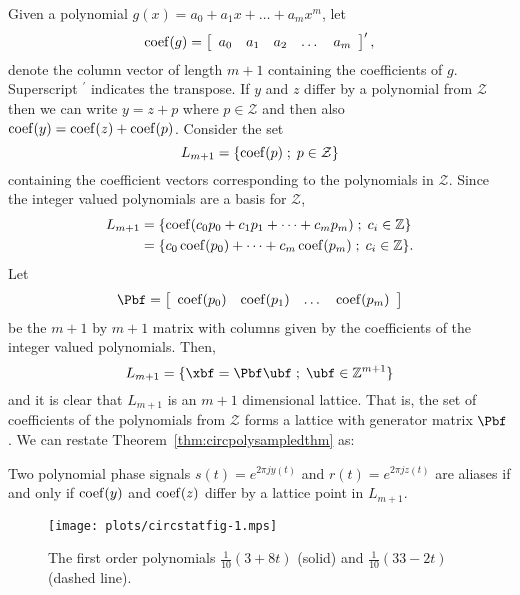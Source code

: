 \documentclass[journal]{IEEEtran}
\begin{document}
Given a polynomial $g(x) = a_0 + a_1x + \dots + a_m x^m$, let
\[
\operatorname{coef}(g) = \left[ \begin{array}{ccccc} a_0 & a_1 & a_2 & \dots & a_m \end{array} \right]^\prime,
\]
denote the column vector of length $m+1$ containing the coefficients of $g$.  Superscript $^\prime$ indicates the transpose.  If $y$ and $z$ differ by a polynomial from $\mathcal{Z}$ then we can write $y = z + p$ where $p \in \mathcal{Z}$ and then also $\operatorname{coef}(y) = \operatorname{coef}(z) + \operatorname{coef}(p)$.
  Consider the set
\[
L_{m+1} = \{ \operatorname{coef}(p) \; ; \; p \in \mathcal{Z} \}
\]
containing the coefficient vectors corresponding to the polynomials in $\mathcal{Z}$.  Since the integer valued polynomials are a basis for $\mathcal{Z}$,
\begin{align*}
L_{m+1} &= \{ \operatorname{coef}(c_0 p_0 + c_1p_1 + \dots + c_mp_m) \; ; \; c_i \in {\mathbb Z} \} \\
&= \{ c_0 \operatorname{coef}(p_0) + \dots + c_m\operatorname{coef}(p_m) \; ; \; c_i \in {\mathbb Z} \}.
\end{align*}
Let
\[
\Pbf = \left[ \begin{array}{cccc} \coef(p_0)& \coef(p_1)& \dots& \coef(p_m)  \end{array} \right]
\]
be the $m+1$ by $m+1$ matrix with columns given by the coefficients of the integer valued polynomials.  Then,
\[
L_{m+1} = \{ \xbf = \Pbf\ubf \mid \ubf \in \ints^{m+1} \}
\]
and it is clear that $L_{m+1}$ is an $m+1$ dimensional lattice.  That is, the set of coefficients of the polynomials from $\mathcal{Z}$ forms a lattice with generator matrix $\Pbf$. We can restate Theorem~\ref{thm:circpolysampledthm} as:
\begin{corollary}\label{cor:circpolysampledcoef}
Two polynomial phase signals $s(t) = e^{2\pi j y(t)}$  and $r(t) = e^{2\pi j z(t)}$ are aliases if and only if $\operatorname{coef}(y)$ and $\operatorname{coef}(z)$ differ by a lattice point in $L_{m+1}$.
\end{corollary}


\begin{figure}[t]
	\centering
		\texttt{[image: plots/circstatfig-1.mps]}
		\caption{The first order polynomials $\tfrac{1}{10}(3 + 8t)$ (solid) and $\tfrac{1}{10}(33 - 2t)$ (dashed line).}
		\label{fig:circstatplot_line}
\end{figure}
\end{document}
